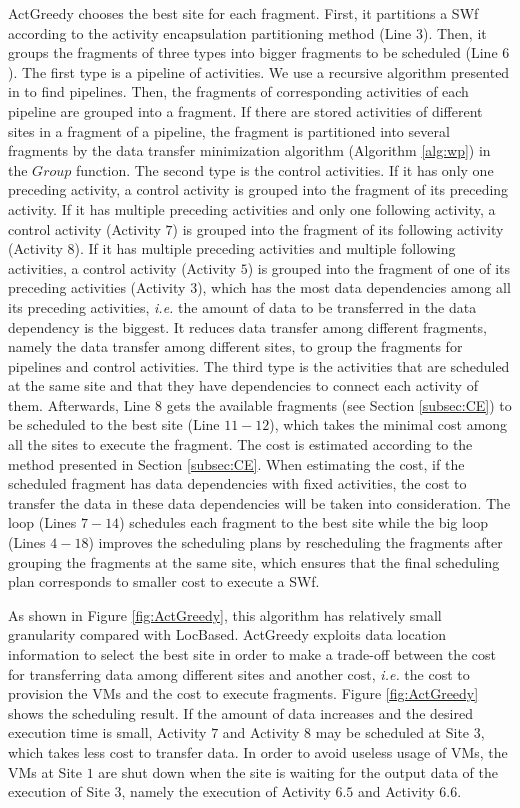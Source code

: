 ActGreedy chooses the best site for each fragment. 
First, it partitions a SWf according to the activity encapsulation partitioning method (Line $3$). 
Then, it groups the fragments of three types into bigger fragments to be scheduled (Line $6$).
The first type is a pipeline of activities. We use a recursive algorithm presented in \cite{Rodriguez2015} to find pipelines. Then, the fragments of corresponding activities of each pipeline are grouped into a fragment.
If there are stored activities of different sites in a fragment of a pipeline, the fragment is partitioned into several fragments by the data transfer minimization algorithm (Algorithm \ref{alg:wp}) in the $Group$ function.
The second type is the control activities. If it has only one preceding activity, a control activity is grouped into the fragment of its preceding activity. If it has multiple preceding activities and only one following activity, a control activity (Activity $7$) is grouped into the fragment of its following activity (Activity $8$). If it has multiple preceding activities and multiple following activities, a control activity (Activity $5$) is grouped into the fragment of one of its preceding activities (Activity $3$), which has the most data dependencies among all its preceding activities, \textit{i.e.} the amount of data to be transferred in the data dependency is the biggest.
It reduces data transfer among different fragments, namely the data transfer among different sites, to group the fragments for pipelines and control activities.
The third type is the activities that are scheduled at the same site and that they have dependencies to connect each activity of them.
Afterwards, Line $8$ gets the available fragments (see Section \ref{subsec:CE}) to be scheduled to the best site (Line $11 - 12$), which takes the minimal cost among all the sites to execute the fragment. The cost is estimated according to the method presented in Section \ref{subsec:CE}. When estimating the cost, if the scheduled fragment has data dependencies with fixed activities, the cost to transfer the data in these data dependencies will be taken into consideration. The loop (Lines $7-14$) schedules each fragment to the best site while the big loop (Lines $4 - 18$) improves the scheduling plans by rescheduling the fragments after grouping the fragments at the same site, which ensures that the final scheduling plan corresponds to smaller cost to execute a SWf.

As shown in Figure \ref{fig:ActGreedy}, this algorithm has relatively small granularity compared with LocBased. ActGreedy exploits data location information to select the best site in order to make a trade-off between the cost for transferring data among different sites and another cost, \textit{i.e.} the cost to provision the VMs and the cost to execute fragments. Figure \ref{fig:ActGreedy} shows the scheduling result. If the amount of data increases and the desired execution time is small, Activity $7$ and Activity $8$ may be scheduled at Site $3$, which takes less cost to transfer data. In order to avoid useless usage of VMs, the VMs at Site $1$ are shut down when the site is waiting for the output data of the execution of Site $3$, namely the execution of Activity $6.5$ and Activity $6.6$.


